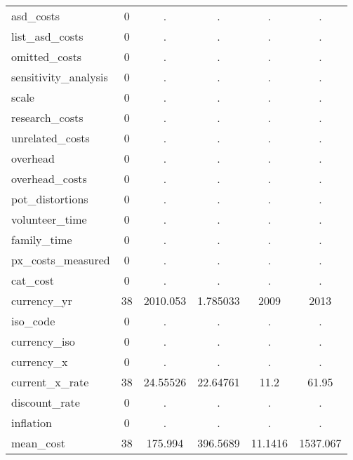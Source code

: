 \begin{table}[htbp]
\begin{tabular}{l*{1}{ccccc}}
asd\_costs   &           0&           .&           .&           .&           .\\
list\_asd\_costs&           0&           .&           .&           .&           .\\
omitted\_costs&           0&           .&           .&           .&           .\\
sensitivity\_analysis&           0&           .&           .&           .&           .\\
scale       &           0&           .&           .&           .&           .\\
research\_costs&           0&           .&           .&           .&           .\\
unrelated\_costs&           0&           .&           .&           .&           .\\
overhead    &           0&           .&           .&           .&           .\\
overhead\_costs&           0&           .&           .&           .&           .\\
pot\_distortions&           0&           .&           .&           .&           .\\
volunteer\_time&           0&           .&           .&           .&           .\\
family\_time &           0&           .&           .&           .&           .\\
px\_costs\_measured&           0&           .&           .&           .&           .\\
cat\_cost    &           0&           .&           .&           .&           .\\
currency\_yr &          38&    2010.053&    1.785033&        2009&        2013\\
iso\_code    &           0&           .&           .&           .&           .\\
currency\_iso&           0&           .&           .&           .&           .\\
currency\_x  &           0&           .&           .&           .&           .\\
current\_x\_rate&          38&    24.55526&    22.64761&        11.2&       61.95\\
discount\_rate&           0&           .&           .&           .&           .\\
inflation   &           0&           .&           .&           .&           .\\
mean\_cost   &          38&     175.994&    396.5689&     11.1416&    1537.067\\

\end{tabular}
\end{table}
